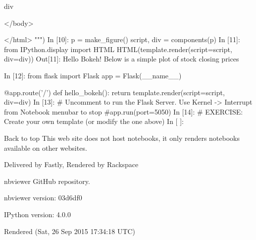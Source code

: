     {{ div }}

</body>

</html>
""")
In [10]:
p = make_figure()
script, div = components(p)
In [11]:
from IPython.display import HTML
HTML(template.render(script=script, div=div))
Out[11]:
Hello Bokeh!
Below is a simple plot of stock closing prices

	
In [12]:
from flask import Flask
app = Flask(__name__)

@app.route('/')
def hello_bokeh():
    return template.render(script=script, div=div)
In [13]:
# Uncomment to run the Flask Server. Use Kernel -> Interrupt from Notebook menubar to stop 
#app.run(port=5050)
In [14]:
# EXERCISE: Create your own template (or modify the one above) 
In [ ]:
 
Back to top
This web site does not host notebooks, it only renders notebooks available on other websites.

Delivered by Fastly, Rendered by Rackspace

nbviewer GitHub repository.

nbviewer version: 03d6df0

IPython version: 4.0.0

Rendered (Sat, 26 Sep 2015 17:34:18 UTC)
